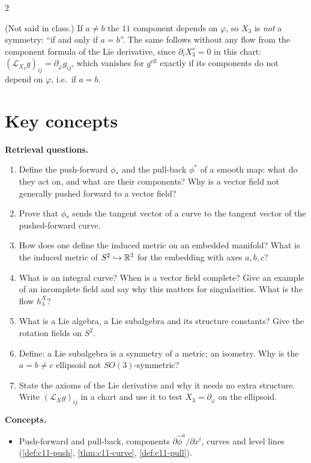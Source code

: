 \begin{paracol}{2}
\begin{enumerate}
\end{enumerate}
\begin{coursenote}
(Not said in class.) If $a\neq b$ the $11$ component depends on $\varphi$, so $X_3$ is \emph{not} a symmetry: ``if and only if $a=b$''. The same follows without any flow from the component formula of the Lie derivative, since $\partial_iX_3^s=0$ in this chart: $(\mathcal L_{X_3}g)_{ij}=\partial_\varphi g_{ij}$, which vanishes for $g^{\mathrm{ell}}$ exactly if its components do not depend on $\varphi$, i.e.\ if $a=b$.
\end{coursenote}

\section*{Key concepts}
\begin{keyconcepts}
\textbf{Retrieval questions.}
\begin{enumerate}
  \item Define the push-forward $\phi_*$ and the pull-back $\phi^*$ of a smooth map: what do they act on, and what are their components? Why is a vector field not generally pushed forward to a vector field?
  \item Prove that $\phi_*$ sends the tangent vector of a curve to the tangent vector of the pushed-forward curve.
  \item How does one define the induced metric on an embedded manifold? What is the induced metric of $S^2\hookrightarrow\mathbb{R}^3$ for the embedding with axes $a,b,c$?
  \item What is an integral curve? When is a vector field complete? Give an example of an incomplete field and say why this matters for singularities. What is the flow $h^X_\lambda$?
  \item What is a Lie algebra, a Lie subalgebra and its structure constants? Give the rotation fields on $S^2$.
  \item Define: a Lie subalgebra is a symmetry of a metric; an isometry. Why is the $a=b\neq c$ ellipsoid not $SO(3)$-symmetric?
  \item State the axioms of the Lie derivative and why it needs no extra structure. Write $(\mathcal L_Xg)_{ij}$ in a chart and use it to test $X_3=\partial_\varphi$ on the ellipsoid.
\end{enumerate}
\textbf{Concepts.}
\begin{itemize}
  \item Push-forward and pull-back, components $\partial\hat\phi^a/\partial x^i$, curves and level lines (\cref{def:c11-push}, \cref{thm:c11-curve}, \cref{def:c11-pull}).

\end{itemize}
\end{keyconcepts}
\end{paracol}
